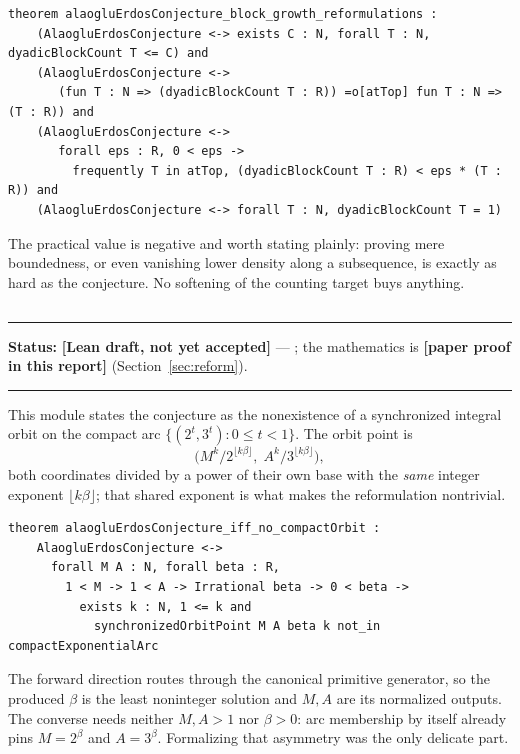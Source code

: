 \documentclass[11pt,oneside]{article}
\theoremstyle{definition}
\theoremstyle{remark}
\newcommand{\lean}[1]{\texttt{\detokenize{#1}}}
\newcommand{\statusnew}{\textcolor{newgreen}{\textbf{[paper proof in this report]}}}
\newcommand{\statusdraft}{\textcolor{computeviolet}{\textbf{[Lean draft, not yet accepted]}}}
\newenvironment{statusbox}[1]
{\begin{center}\begin{minipage}{0.94\textwidth}\raggedright\hbadness=10000\hrule
\vspace{0.45em}\textbf{Status:} #1\par\vspace{0.35em}}
{\vspace{0.35em}\hrule\end{minipage}\end{center}}
\begin{document}
\begin{lstlisting}[style=leanstyle,caption={Block-growth reformulations.}]
theorem alaogluErdosConjecture_block_growth_reformulations :
    (AlaogluErdosConjecture <-> exists C : N, forall T : N, dyadicBlockCount T <= C) and
    (AlaogluErdosConjecture <->
       (fun T : N => (dyadicBlockCount T : R)) =o[atTop] fun T : N => (T : R)) and
    (AlaogluErdosConjecture <->
       forall eps : R, 0 < eps ->
         frequently T in atTop, (dyadicBlockCount T : R) < eps * (T : R)) and
    (AlaogluErdosConjecture <-> forall T : N, dyadicBlockCount T = 1)
\end{lstlisting}

The practical value is negative and worth stating plainly: proving mere boundedness, or even
vanishing lower density along a subsequence, is exactly as hard as the conjecture.  No
softening of the counting target buys anything.

\subsection{\lean{CompactOrbit}}
\label{bp:compactorbit-module}

\begin{statusbox}{\statusdraft{} --- \lean{CompactOrbit.lean}; the mathematics is
\statusnew{} (Section~\ref{sec:reform}).}
\end{statusbox}

This module states the conjecture as the nonexistence of a synchronized integral orbit on
the compact arc $\{(2^t,3^t):0\le t<1\}$.  The orbit point is
\[
 \bigl(M^k/2^{\lfloor k\beta\rfloor},\;A^k/3^{\lfloor k\beta\rfloor}\bigr),
\]
both coordinates divided by a power of their own base with the \emph{same} integer exponent
$\lfloor k\beta\rfloor$; that shared exponent is what makes the reformulation nontrivial.

\begin{lstlisting}[style=leanstyle,caption={Compact-orbit reformulation.}]
theorem alaogluErdosConjecture_iff_no_compactOrbit :
    AlaogluErdosConjecture <->
      forall M A : N, forall beta : R,
        1 < M -> 1 < A -> Irrational beta -> 0 < beta ->
          exists k : N, 1 <= k and
            synchronizedOrbitPoint M A beta k not_in compactExponentialArc
\end{lstlisting}

The forward direction routes through the canonical primitive generator, so the produced
$\beta$ is the least noninteger solution and $M,A$ are its normalized outputs.  The converse
needs neither $M,A>1$ nor $\beta>0$: arc membership by itself already pins $M=2^\beta$ and
$A=3^\beta$.  Formalizing that asymmetry was the only delicate part.
\end{document}
